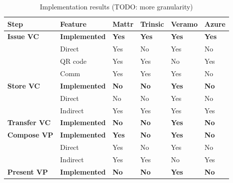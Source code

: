    \begin{table}[htp!]
    	\begin{threeparttable}
            \centering
            \caption{Implementation results (TODO: more granularity)}
            \begin{tabular}{llllll} 
            \hline
            \textbf{ Step }         & \textbf{Feature }     & \textbf{Mattr } & \textbf{Trinsic } & \textbf{Veramo } & \textbf{Azure }  \\ 
            \hline
            \textbf{Issue VC}       & \textbf{Implemented}  & \textbf{Yes}    & \textbf{Yes}      & \textbf{Yes}     & \textbf{Yes}     \\
                                    & Direct                & Yes             & No                & Yes              & No               \\
                                    & QR code               & Yes             & Yes               & No\tnote{2}             & Yes              \\
                                    & Comm                  & Yes\tnote{1}            & Yes\tnote{1}              & Yes              & No               \\
            \textbf{Store VC}       & \textbf{Implemented}  & \textbf{No}     & \textbf{No}       & \textbf{Yes }    & \textbf{No}      \\
                                    & Direct                & No              & No                & Yes              & No               \\
                                    & Indirect              & Yes             & Yes               & Yes              & Yes              \\
            \textbf{Transfer VC}    & \textbf{Implemented}  & \textbf{No }    & \textbf{No }      & \textbf{Yes\tnote{3}}  & \textbf{No }     \\
            \textbf{Compose VP }    & \textbf{Implemented}  & \textbf{Yes }   & \textbf{No}       & \textbf{Yes }    & \textbf{No}      \\
                                    & Direct                & Yes             & No                & Yes              & No               \\
                                    & Indirect              & Yes             & Yes               & No\tnote{2}             & Yes              \\
            \textbf{Present VP }    & \textbf{Implemented}  & \textbf{No}     & \textbf{No}       & \textbf{Yes}     & \textbf{No}      \\

\end{tabular}
\end{threeparttable}
\end{table}
